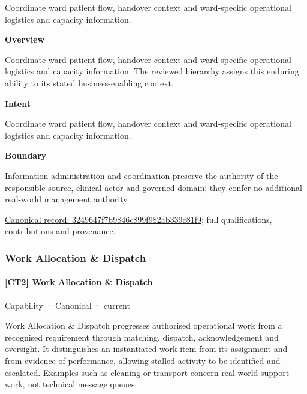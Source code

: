 Coordinate ward patient flow, handover context and ward-specific operational logistics and capacity information.



\textbf{Overview}



Coordinate ward patient flow, handover context and ward-specific operational logistics and capacity information. The reviewed hierarchy assigns this enduring ability to its stated business-enabling context.



\textbf{Intent}



Coordinate ward patient flow, handover context and ward-specific operational logistics and capacity information.



\textbf{Boundary}



Information administration and coordination preserve the authority of the responsible source, clinical actor and governed domain; they confer no additional real-world management authority.


{\footnotesize \href{../../../../continuum/strategy/capability/3249647f7b9846c899f982ab339c81f9.md}{Canonical record: 3249647f7b9846c899f982ab339c81f9}; full qualifications, contributions and provenance.}\par
\subsubsection{Work Allocation \& Dispatch}

\paragraph{[CT2] Work Allocation \& Dispatch}

\label{element:152a5252952c405994e9b171234efcb0}
{\small Capability · Canonical · current}\par

Work Allocation \& Dispatch progresses authorised operational work from a recognised requirement through matching, dispatch, acknowledgement and oversight. It distinguishes an instantiated work item from its assignment and from evidence of performance, allowing stalled activity to be identified and escalated. Examples such as cleaning or transport concern real-world support work, not technical message queues.



